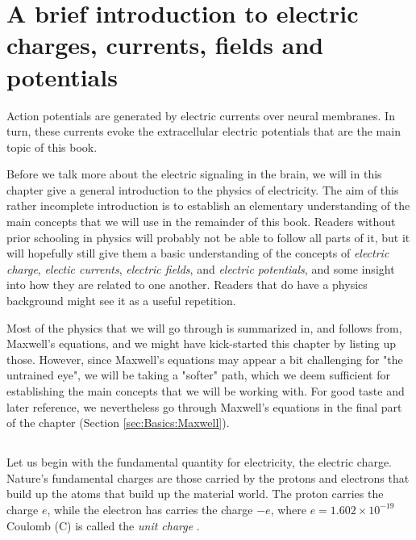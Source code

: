 \chapter{A brief introduction to electric charges, currents, fields and potentials} 
\label{sec:Basics}
Action potentials are generated by electric currents over neural membranes. In turn, these currents
evoke the extracellular electric potentials that are the main topic of this book. 

Before we talk more about the electric signaling in the brain, we will in this chapter give a general introduction to the physics of electricity. The aim of this rather incomplete introduction is to establish an elementary understanding of the main concepts that we will use in the remainder of this book. Readers without prior schooling in physics will probably not be able to follow all parts of it, but it will hopefully still give them a basic understanding of the concepts of \textit{electric charge}, \textit{electic currents}, \textit{electric fields}, and \textit{electric potentials}, and some insight into how they are related to one another. Readers that do have a physics background might see it as a useful repetition. 

Most of the physics that we will go through is summarized in, and follows from, Maxwell's equations, and we might have kick-started this chapter by listing up those. However, since Maxwell's equations may appear a bit challenging for "the untrained eye", we will be taking a "softer" path, which we deem sufficient for establishing the main concepts that we will be working with. For good taste and later reference, we nevertheless go through Maxwell's equations in the final part of the chapter (Section \ref{sec:Basics:Maxwell}).


\section{}
\label{Sec:Basics:Charge} 
Let us begin with the fundamental quantity for electricity, the electric charge. Nature's fundamental charges are those carried by the protons and electrons that build up the atoms that build up the material world. The proton carries the charge $e$, while the electron has carries the charge $-e$, where $e = 1.602\times10^{-19}$ Coulomb (C) is called the \textit{unit charge} . 

